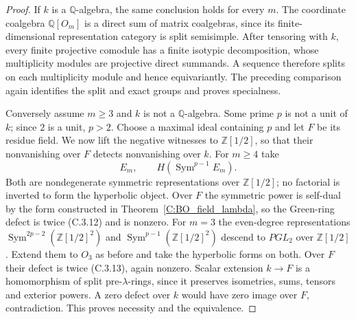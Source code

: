 \begin{proof}
If $k$ is a $\mathbb Q$-algebra, the same conclusion holds for every
$m$. The coordinate coalgebra $\mathbb Q[O_m]$ is a direct sum of
matrix coalgebras, since its finite-dimensional representation category
is split semisimple. After tensoring with $k$, every finite projective
comodule has a finite isotypic decomposition, whose multiplicity modules
are projective direct summands. A sequence therefore splits on each
multiplicity module and hence equivariantly. The preceding comparison
again identifies the split and exact groups and proves specialness.

Conversely assume $m\geq3$ and $k$ is not a $\mathbb Q$-algebra.
Some prime $p$ is not a unit of $k$; since $2$ is a unit, $p>2$.
Choose a maximal ideal containing $p$ and let $F$ be its residue field.
We now lift the negative witnesses to $\mathbb Z[1/2]$, so that their
nonvanishing over $F$ detects nonvanishing over $k$.
For $m\geq4$ take
\[
 E_m,\qquad H(\operatorname{Sym}^{p-1}E_m).
\]
Both are nondegenerate symmetric representations over $\mathbb Z[1/2]$;
no factorial is inverted to form the hyperbolic object. Over $F$ the
symmetric power is self-dual by the form constructed in
Theorem~\ref{C:BO_field_lambda}, so the Green-ring defect is twice
(C.3.12) and is nonzero. For $m=3$ the even-degree representations
$\operatorname{Sym}^{2p-2}(\mathbb Z[1/2]^2)$ and
$\operatorname{Sym}^{p-1}(\mathbb Z[1/2]^2)$ descend to $PGL_2$
over $\mathbb Z[1/2]$. Extend them to $O_3$ as before and take the
hyperbolic forms on both. Over $F$ their defect is twice (C.3.13),
again nonzero. Scalar extension $k\to F$ is a homomorphism of split
pre-$\lambda$-rings, since it preserves isometries, sums, tensors and
exterior powers. A zero defect over $k$ would have zero image over
$F$, contradiction. This proves necessity and the equivalence.
\end{proof}

